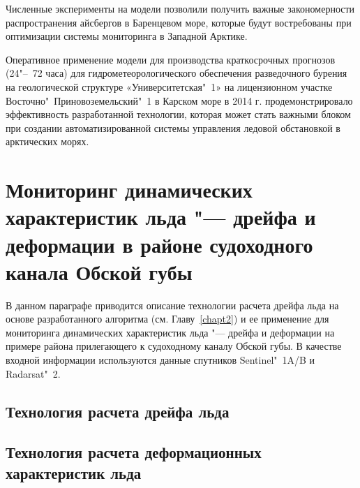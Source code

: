 Численные эксперименты на модели позволили получить важные закономерности распространения айсбергов в Баренцевом море, которые будут востребованы при оптимизации системы мониторинга в Западной Арктике.

Оперативное применение модели для производства краткосрочных прогнозов (24"--~72 часа) для гидрометеорологического обеспечения разведочного бурения на геологической структуре «Университетская"~1» на лицензионном участке Восточно"~Приновоземельский"~1 в Карском море в 2014 г. продемонстрировало эффективность разработанной технологии, которая может стать важными блоком при создании автоматизированной системы управления ледовой обстановкой в арктических морях.

\newpage

\section{Мониторинг динамических характеристик льда "--- дрейфа и деформации в районе судоходного канала Обской губы} \label{sect4_2}

В данном параграфе приводится описание технологии расчета дрейфа льда на основе разработанного алгоритма (см. Главу~\ref{chapt2}) и ее применение для мониторинга динамических характеристик льда "--- дрейфа и деформации на примере района прилегающего к судоходному каналу Обской губы. В качестве входной информации используются данные спутников Sentinel"~1A/B и Radarsat"~2.

\subsection{Технология расчета дрейфа льда} \label{subsect4_2_1}

\subsection{Технология расчета деформационных характеристик льда} \label{subsect4_2_2}

